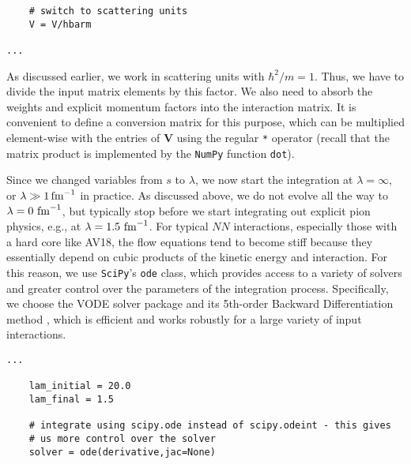 {\begin{lstlisting}
    # switch to scattering units
    V = V/hbarm

...
\end{lstlisting}

As discussed earlier, we work in scattering units with $\hbar^2/m=1$. Thus,
we have to divide the input matrix elements by this factor. We also need to
absorb the weights and explicit momentum factors into the interaction matrix.
It is convenient to define a conversion matrix for this purpose, which can
be multiplied element-wise with the entries of $\mathbf{V}$ using the 
regular \texttt{*} operator (recall that the matrix product is implemented
by the \texttt{NumPy} function \texttt{dot}).


Since we changed variables from $s$ to $\lambda$, we now start the
integration at $\lambda=\infty$, or $\lambda\gg 1\,\text{fm}^{-1}$ in practice.
As discussed above, we do not evolve all the way to $\lambda=0\,\,\text{fm}^{-1}$,
but typically stop before we start integrating out explicit pion
physics, e.g., at $\lambda=1.5\,\,\text{fm}^{-1}$. For typical $NN$ interactions,
especially those with a hard core like AV18, the flow equations tend
to become stiff because they essentially depend on cubic products of
the kinetic energy and interaction. For this reason, we use \texttt{SciPy}'s
\texttt{ode} class, which provides access to a variety of solvers
and greater control over the parameters of the integration process.
Specifically, we choose the VODE solver package and its 5th-order 
Backward Differentiation method \cite{Brown:1989wj}, which is 
efficient and works robustly for a large variety of input interactions.

\begin{lstlisting}
...

    lam_initial = 20.0
    lam_final = 1.5

    # integrate using scipy.ode instead of scipy.odeint - this gives
    # us more control over the solver
    solver = ode(derivative,jac=None)


\end{lstlisting}}
